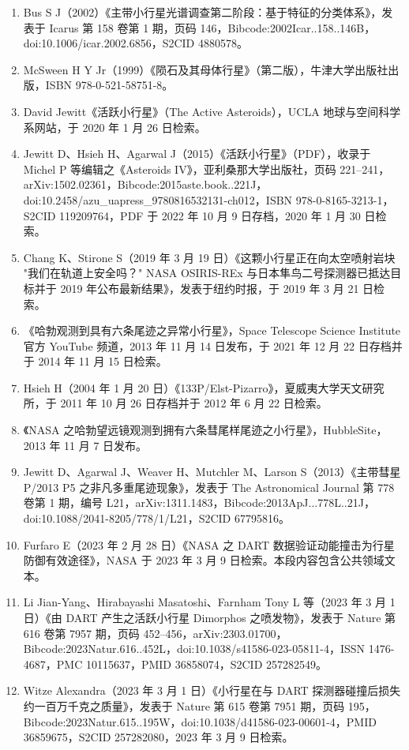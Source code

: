 \begin{enumerate}
\item Bus S J（2002）《主带小行星光谱调查第二阶段：基于特征的分类体系》，发表于 Icarus 第 158 卷第 1 期，页码 146，Bibcode:2002Icar..158..146B，doi:10.1006/icar.2002.6856，S2CID 4880578。
\item McSween H Y Jr（1999）《陨石及其母体行星》（第二版），牛津大学出版社出版，ISBN 978-0-521-58751-8。
\item David Jewitt《活跃小行星》（The Active Asteroids），UCLA 地球与空间科学系网站，于 2020 年 1 月 26 日检索。
\item Jewitt D、Hsieh H、Agarwal J（2015）《活跃小行星》（PDF），收录于 Michel P 等编辑之《Asteroids IV》，亚利桑那大学出版社，页码 221–241，arXiv:1502.02361，Bibcode:2015aste.book..221J，doi:10.2458/azu_uapress_9780816532131-ch012，ISBN 978-0-8165-3213-1，S2CID 119209764，PDF 于 2022 年 10 月 9 日存档，2020 年 1 月 30 日检索。
\item Chang K、Stirone S（2019 年 3 月 19 日）《这颗小行星正在向太空喷射岩块 "我们在轨道上安全吗？" NASA OSIRIS-REx 与日本隼鸟二号探测器已抵达目标并于 2019 年公布最新结果》，发表于纽约时报，于 2019 年 3 月 21 日检索。
\item 《哈勃观测到具有六条尾迹之异常小行星》，Space Telescope Science Institute 官方 YouTube 频道，2013 年 11 月 14 日发布，于 2021 年 12 月 22 日存档并于 2014 年 11 月 15 日检索。
\item Hsieh H（2004 年 1 月 20 日）《133P/Elst-Pizarro》，夏威夷大学天文研究所，于 2011 年 10 月 26 日存档并于 2012 年 6 月 22 日检索。
\item 《NASA 之哈勃望远镜观测到拥有六条彗尾样尾迹之小行星》，HubbleSite，2013 年 11 月 7 日发布。
\item Jewitt D、Agarwal J、Weaver H、Mutchler M、Larson S（2013）《主带彗星 P/2013 P5 之非凡多重尾迹现象》，发表于 The Astronomical Journal 第 778 卷第 1 期，编号 L21，arXiv:1311.1483，Bibcode:2013ApJ...778L..21J，doi:10.1088/2041-8205/778/1/L21，S2CID 67795816。
\item Furfaro E（2023 年 2 月 28 日）《NASA 之 DART 数据验证动能撞击为行星防御有效途径》，NASA 于 2023 年 3 月 9 日检索。本段内容包含公共领域文本。
\item Li Jian-Yang、Hirabayashi Masatoshi、Farnham Tony L 等（2023 年 3 月 1 日）《由 DART 产生之活跃小行星 Dimorphos 之喷发物》，发表于 Nature 第 616 卷第 7957 期，页码 452–456，arXiv:2303.01700，Bibcode:2023Natur.616..452L，doi:10.1038/s41586-023-05811-4，ISSN 1476-4687，PMC 10115637，PMID 36858074，S2CID 257282549。
\item Witze Alexandra（2023 年 3 月 1 日）《小行星在与 DART 探测器碰撞后损失约一百万千克之质量》，发表于 Nature 第 615 卷第 7951 期，页码 195，Bibcode:2023Natur.615..195W，doi:10.1038/d41586-023-00601-4，PMID 36859675，S2CID 257282080，2023 年 3 月 9 日检索。

\end{enumerate}
